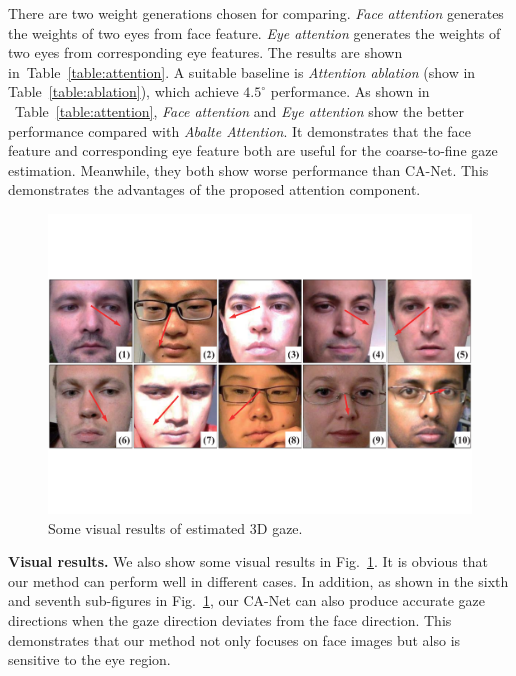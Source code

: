 \documentclass[letterpaper]{article} %
\newcommand{\Tref}[1]{Table~\ref{#1}}
\newcommand{\fref}[1]{Fig.~\ref{#1}}
\begin{document}
There are two weight generations chosen for comparing.
\emph{Face attention} generates the weights of two eyes from face feature.
\emph{Eye attention} generates the weights of two eyes from corresponding eye features.
The results are shown in~\Tref{table:attention}.
A suitable baseline is \emph{Attention ablation} (show in \Tref{table:ablation}), which achieve $4.5^{\circ}$ performance.
As shown in ~\Tref{table:attention}, \emph{Face attention} and \emph{Eye attention} show the better performance compared with \emph{Abalte Attention}.
It demonstrates that the face feature and corresponding eye feature both are useful for the coarse-to-fine gaze estimation.
Meanwhile, they both show worse performance than CA-Net.
This demonstrates the advantages of the proposed attention component.

\begin{figure}[t]
	\begin{center}
		\includegraphics[width=0.99\columnwidth]{Figure-case.pdf}
	\end{center}
	\caption{Some visual results of estimated 3D gaze.}
	\label{fig:casestudy}
\end{figure}

\textbf{Visual results.}
We also show some visual results in \fref{fig:casestudy}.
It is obvious that our method can perform well in different cases.
In addition, as shown in the sixth and seventh sub-figures in \fref{fig:casestudy}, our CA-Net can also produce accurate gaze directions when the gaze direction deviates from the face direction.
This demonstrates that our method not only focuses on face images but also is sensitive to the eye region.
\end{document}
